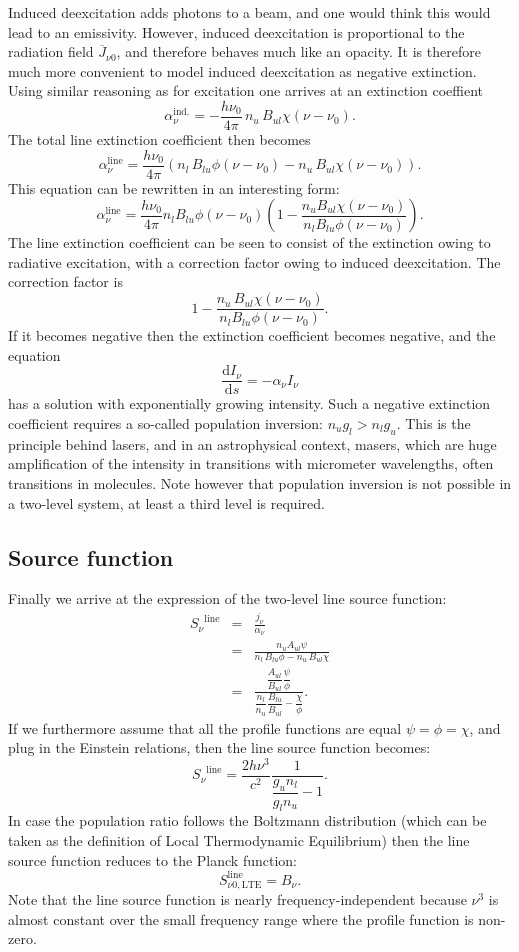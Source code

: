 \documentclass[12pt]{article}
\numberwithin{equation}{section}
\def\dd{\mathrm{d}}
\def\Inu{\ensuremath{I_{\nu}}}
\def\Bnu{\ensuremath{B_{\nu}}}
\def\Snu{\ensuremath{S_{\nu}}}
\def\anu{\ensuremath{\alpha_{\nu}}}
\def\Jbar{\ensuremath{\overline{J}_{\nu0}}}
\newcommand{\be}{\begin{equation}}
\newcommand{\ee}{\end{equation}}
\newcommand{\bea}{\begin{eqnarray}}
\newcommand{\eea}{\end{eqnarray}}
\begin{document}
Induced deexcitation adds photons to a beam, and one would think this would lead to an emissivity. However, induced deexcitation is proportional to the radiation field $\Jbar$, and therefore behaves much like an opacity. It is therefore much more convenient to model induced deexcitation as  negative extinction. Using similar reasoning as for excitation one arrives at an extinction coeffient
\be
\alpha_\nu^\mathrm{ind.} = -\frac{h \nu_0}{4 \pi}  \, n_u \, B_{ul} \chi(\nu-\nu_0).
\ee
The total line extinction coefficient then becomes
\be
\alpha_{\nu}^\mathrm{line} = \frac{h \nu_0}{4 \pi}  \left( n_l \, B_{lu}  \phi(\nu-\nu_0)- n_u \, B_{ul} \chi(\nu-\nu_0) \right).
\ee
This equation can be rewritten in an interesting form:
\be
\alpha_{\nu}^\mathrm{line} = \frac{h \nu_0}{4 \pi} n_l B_{lu}  \phi(\nu-\nu_0) \left( 1 - \frac{n_u B_{ul} \chi(\nu-\nu_0)}{n_l B_{lu}  \phi(\nu-\nu_0)} \right).
\ee
The line extinction coefficient can be seen to consist of the extinction owing to radiative excitation, with a correction factor owing to induced deexcitation. The correction factor is
\be
1 - \frac{n_u \, B_{ul} \chi(\nu-\nu_0)}{n_l B_{lu}  \phi(\nu-\nu_0)}.
\ee
If it becomes negative then the extinction coefficient becomes negative, and the equation
\be
\frac{\dd \Inu}{\dd s} = - \alpha_\nu \Inu
\ee
has a solution with exponentially growing intensity. Such a negative extinction coefficient requires a so-called population inversion: $n_u g_l > n_l g_u$. This is the principle behind lasers, and in an astrophysical context, masers, which are huge amplification of the intensity in transitions with micrometer wavelengths, often transitions in molecules. Note however that population inversion is not possible in a two-level system, at least a third level is required.

\subsection{Source function}
Finally we arrive at the expression of the two-level line source function:
\bea
 \Snu^\mathrm{line} &=&\frac{j_\nu}{\anu}  \nonumber \\
    &=& \frac{n_u A_{ul} \psi} {n_l \, B_{lu} \phi - n_u \, B_{ul} \chi } \nonumber \\
      &=& \frac{\dfrac{A_{ul}}{B_{ul}} \dfrac{\psi}{\phi}} {\dfrac{n_l}{n_u} \dfrac{B_{lu}}{B_{ul}} -\dfrac{\chi}{\phi} }.
\eea
If we furthermore assume that all the profile functions are equal $\psi=\phi=\chi$, and plug in the Einstein relations, then the line source function becomes:
\be
\Snu^\mathrm{line} = \frac{2 h \nu^3}{c^2} \frac{1}{ \dfrac{g_u n_l}{g_l n_u} -1}.
\ee
In case the population ratio follows the Boltzmann distribution (which can be taken as the definition of Local Thermodynamic Equilibrium) then the line source function reduces to the Planck function:
\be
S^\mathrm{line}_{\nu0,\mathrm{LTE}} = \Bnu.
\ee
Note that the line source function is nearly frequency-independent  because $\nu^3$ is almost constant over the small frequency range where the profile function is non-zero.
\end{document}
